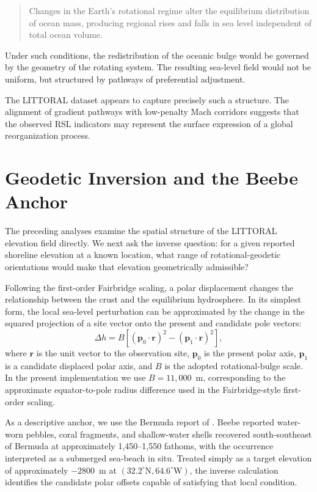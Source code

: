 \documentclass[twocolumn,10pt]{article}
\begin{document}
\begin{quote}
Changes in the Earth's rotational regime alter the equilibrium distribution of ocean mass, producing regional rises and falls in sea level independent of total ocean volume.
\end{quote}

Under such conditions, the redistribution of the oceanic bulge would be governed by the geometry of the rotating system. The resulting sea-level field would not be uniform, but structured by pathways of preferential adjustment.

The LITTORAL dataset appears to capture precisely such a structure. The alignment of gradient pathways with low-penalty Mach corridors suggests that the observed RSL indicators may represent the surface expression of a global reorganization process.

\section{Geodetic Inversion and the Beebe Anchor}

The preceding analyses examine the spatial structure of the LITTORAL elevation field directly. We next ask the inverse question: for a given reported shoreline elevation at a known location, what range of rotational-geodetic orientations would make that elevation geometrically admissible?

Following the first-order Fairbridge scaling, a polar displacement changes the relationship between the crust and the equilibrium hydrosphere. In its simplest form, the local sea-level perturbation can be approximated by the change in the squared projection of a site vector onto the present and candidate pole vectors:
\begin{equation}
\Delta h = B \left[ \left(\mathbf{p}_0 \cdot \mathbf{r}\right)^2 -
\left(\mathbf{p}_1 \cdot \mathbf{r}\right)^2 \right],
\end{equation}
where $\mathbf{r}$ is the unit vector to the observation site, $\mathbf{p}_0$ is the present polar axis, $\mathbf{p}_1$ is a candidate displaced polar axis, and $B$ is the adopted rotational-bulge scale. In the present implementation we use $B=11{,}000$~m, corresponding to the approximate equator-to-pole radius difference used in the Fairbridge-style first-order scaling.

As a descriptive anchor, we use the Bermuda report of \citet{beebe1931}. Beebe reported water-worn pebbles, coral fragments, and shallow-water shells recovered south-southeast of Bermuda at approximately 1,450--1,550 fathoms, with the occurrence interpreted as a submerged sea-beach in situ. Treated simply as a target elevation of approximately $-2800$~m at $(32.2^\circ\mathrm{N}, 64.6^\circ\mathrm{W})$, the inverse calculation identifies the candidate polar offsets capable of satisfying that local condition.
\end{document}
